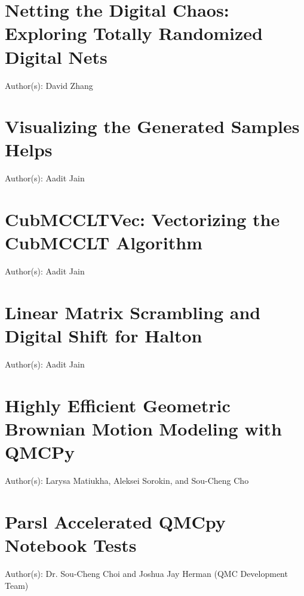 \documentclass{article}
\newcommand{\blogpost}[5][{}]{\newpage%
\section{#2 {\color{teal}#1}}%
\begin{refsection}%
    \label{#4}%
	Author(s): #3 \newline \newline%
\printbibliography[heading=subbibliography]
\end{refsection}
} %
\theoremstyle{definition}
\begin{document}

 \blogpost{Netting the Digital Chaos: Exploring Totally Randomized Digital Nets}{David Zhang}{}{TotallyRandomDnet/totallyrandomdnet}










\blogpost{Visualizing the Generated Samples Helps}{Aadit Jain}{plotproj}{PlotProjectionsFunction/plotprojectionsfunction}

\blogpost{CubMCCLTVec: Vectorizing the CubMCCLT Algorithm}{Aadit Jain}{cubmccltvec}{CubMCCLTVec/cubmccltvec}

\blogpost{Linear Matrix Scrambling and Digital Shift for Halton}{Aadit Jain}{lms_ds_halton}{LMS_DS_Halton/lms_ds_halton}

\blogpost{Highly Efficient Geometric Brownian Motion Modeling with QMCPy}{Larysa Matiukha, Aleksei Sorokin, and Sou-Cheng Cho}{gbm}{GBM/gbm}

\blogpost{Parsl Accelerated QMCpy Notebook Tests}{Dr. Sou-Cheng Choi and Joshua Jay Herman (QMC Development Team)}{parslTestbookQMCblog}{booktests/parslTestbookQMCblog}
\end{document}
